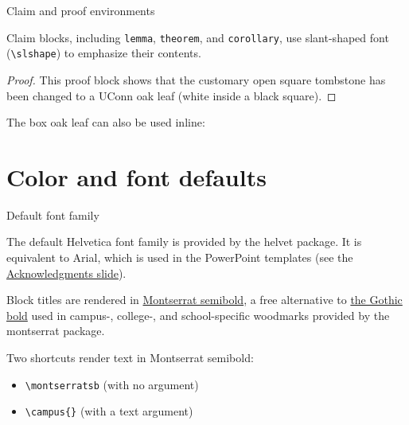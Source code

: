 \documentclass{beamer}
\begin{document}
\begin{frame}[fragile]{Claim and proof environments}

\begin{theorem}
Claim blocks, including \verb|lemma|, \verb|theorem|, and \verb|corollary|, use slant-shaped font (\verb|\slshape|) to emphasize their contents.
\end{theorem}

\begin{proof}
This proof block shows that the customary open square tombstone has been changed to a UConn oak leaf (white inside a black square).
\end{proof}

\begin{corollary}
The box oak leaf can also be used inline: \oakleafbox
\end{corollary}

\end{frame}


\section{Color and font defaults}


\begin{frame}[fragile]{Default font family}

The default Helvetica font family is provided by the {\ttfamily helvet} package.
It is equivalent to Arial, which is used in the PowerPoint templates (see the \hyperlink{slide:acknowledgments}{Acknowledgments slide}).

Block titles are rendered in \href{http://mirrors.ibiblio.org/CTAN/fonts/montserrat/doc/montserrat-doc.pdf}{{\montserratsb Montserrat semibold}}, a free alternative to \href{https://brand.uconn.edu/standards/fonts/}{the Gothic bold} used in campus-, college-, and school-specific woodmarks provided by the {\ttfamily montserrat} package.

Two shortcuts render text in Montserrat semibold:
\begin{itemize}
\item \verb|\montserratsb| (with no argument)
\item \verb|\campus{}| (with a text argument)
\end{itemize}

\end{frame}
\end{document}
